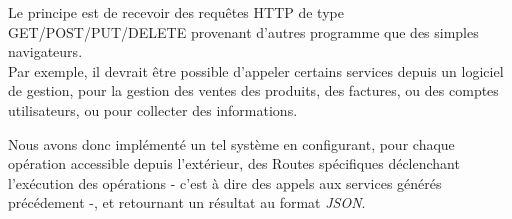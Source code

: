 Le principe est de recevoir des requêtes HTTP de type GET/POST/PUT/DELETE provenant d'autres programme que des simples navigateurs. \\
Par exemple, il devrait être possible d'appeler certains services depuis un logiciel de gestion, pour la gestion des ventes des produits, des factures, ou des comptes utilisateurs, ou pour collecter des informations.


Nous avons donc implémenté un tel système en configurant, pour chaque opération accessible depuis l'extérieur, des Routes spécifiques déclenchant l'exécution des opérations - c'est à dire des appels aux services générés précédement -, et retournant un résultat au format \textit{JSON}.


\clearpage
